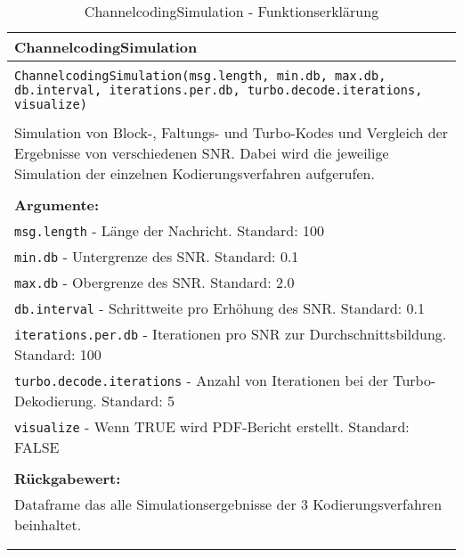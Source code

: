 \begin{longtable}{|p{\textwidth}|}
\hline
\rowcolor{lightblue}ChannelcodingSimulation\\
\hline
\\
\texttt{ChannelcodingSimulation(msg.length, min.db, max.db, db.interval, iterations.per.db, turbo.decode.iterations, visualize)}\\
\\
Simulation von Block-, Faltungs- und Turbo-Kodes und Vergleich der Ergebnisse von verschiedenen SNR. Dabei wird die jeweilige Simulation der einzelnen Kodierungsverfahren aufgerufen.\\
\\
\textbf{Argumente:}\\
\texttt{msg.length} - Länge der Nachricht. Standard: 100\\
\texttt{min.db} - Untergrenze des SNR. Standard: 0.1\\
\texttt{max.db} - Obergrenze des SNR. Standard: 2.0\\
\texttt{db.interval} - Schrittweite pro Erhöhung des SNR. Standard: 0.1\\
\texttt{iterations.per.db} - Iterationen pro SNR zur Durchschnittsbildung. Standard: 100\\
\texttt{turbo.decode.iterations} - Anzahl von Iterationen bei der Turbo-Dekodierung. Standard: 5\\
\texttt{visualize} - Wenn TRUE wird PDF-Bericht erstellt. Standard: FALSE\\
\\
\textbf{Rückgabewert:}\\
Dataframe das alle Simulationsergebnisse der 3 Kodierungsverfahren beinhaltet.\\
\\
\hline
\caption{ChannelcodingSimulation - Funktionserklärung}
\end{longtable}